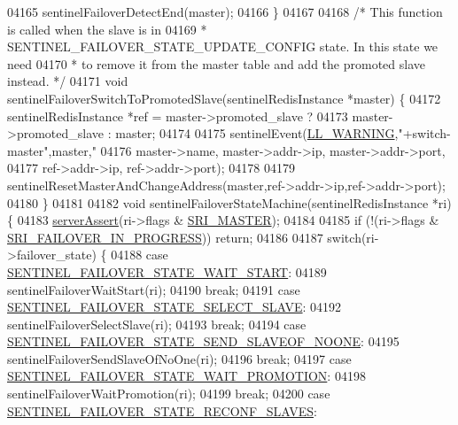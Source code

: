 \begin{DoxyCode}
{{{{{{{{{{{{{{{{{{{{{{{{{{{{{{{{{{{{{{{{{{{{{{{{{{{{{{{{{{{{{{{{{{{{{{{{{{{{{{{{{{{{{{{{{{{{{{{{{{{{{04165     sentinelFailoverDetectEnd(master);
04166 \}
04167 
04168 \textcolor{comment}{/* This function is called when the slave is in}
04169 \textcolor{comment}{ * SENTINEL\_FAILOVER\_STATE\_UPDATE\_CONFIG state. In this state we need}
04170 \textcolor{comment}{ * to remove it from the master table and add the promoted slave instead. */}
04171 \textcolor{keywordtype}{void} sentinelFailoverSwitchToPromotedSlave(sentinelRedisInstance *master) \{
04172     sentinelRedisInstance *ref = master->promoted\_slave ?
04173                                  master->promoted\_slave : master;
04174 
04175     sentinelEvent(\hyperlink{server_8h_a31229b9334bba7d6be2a72970967a14b}{LL\_WARNING},\textcolor{stringliteral}{"+switch-master"},master,\textcolor{stringliteral}{"%
04176         master->name, master->addr->ip, master->addr->port,
04177         ref->addr->ip, ref->addr->port);
04178 
04179     sentinelResetMasterAndChangeAddress(master,ref->addr->ip,ref->addr->port);
04180 \}
04181 
04182 \textcolor{keywordtype}{void} sentinelFailoverStateMachine(sentinelRedisInstance *ri) \{
04183     \hyperlink{server_8h_a88114b5169b4c382df6b56506285e56a}{serverAssert}(ri->flags & \hyperlink{sentinel_8c_a2ee83e5ff67b45746cd6a310f15334b2}{SRI\_MASTER});
04184 
04185     \textcolor{keywordflow}{if} (!(ri->flags & \hyperlink{sentinel_8c_a0546b63633196f09fcd90957243b0798}{SRI\_FAILOVER\_IN\_PROGRESS})) \textcolor{keywordflow}{return};
04186 
04187     \textcolor{keywordflow}{switch}(ri->failover\_state) \{
04188         \textcolor{keywordflow}{case} \hyperlink{sentinel_8c_a83bf9fce7cbb7bf1b0723ced2d434366}{SENTINEL\_FAILOVER\_STATE\_WAIT\_START}:
04189             sentinelFailoverWaitStart(ri);
04190             \textcolor{keywordflow}{break};
04191         \textcolor{keywordflow}{case} \hyperlink{sentinel_8c_ab69af026a9f736ca81bfffd4eeada38f}{SENTINEL\_FAILOVER\_STATE\_SELECT\_SLAVE}:
04192             sentinelFailoverSelectSlave(ri);
04193             \textcolor{keywordflow}{break};
04194         \textcolor{keywordflow}{case} \hyperlink{sentinel_8c_ac89d5b0fc38860b277528c7d3a854580}{SENTINEL\_FAILOVER\_STATE\_SEND\_SLAVEOF\_NOONE}:
04195             sentinelFailoverSendSlaveOfNoOne(ri);
04196             \textcolor{keywordflow}{break};
04197         \textcolor{keywordflow}{case} \hyperlink{sentinel_8c_a49d9c64c03e76dcbf7728ad64dd99330}{SENTINEL\_FAILOVER\_STATE\_WAIT\_PROMOTION}:
04198             sentinelFailoverWaitPromotion(ri);
04199             \textcolor{keywordflow}{break};
04200         \textcolor{keywordflow}{case} \hyperlink{sentinel_8c_a05b020edfa71eb4d24288e79637b57f5}{SENTINEL\_FAILOVER\_STATE\_RECONF\_SLAVES}:
}}}}}}}}}}}}}}}}}}}}}}}}}}}}}}}}}}}}}}}}}}}}}}}}}}}}}}}}}}}}}}}}}}}}}}}}}}}}}}}}}}}}}}}}}}}}}}}}}}}}}}
\end{DoxyCode}
